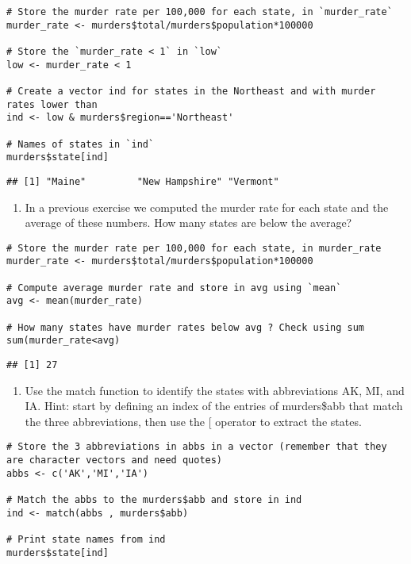 \documentclass[
]{article}
\providecommand{\tightlist}{%
  \setlength{\itemsep}{0pt}\setlength{\parskip}{0pt}}
\begin{document}
\begin{verbatim}
# Store the murder rate per 100,000 for each state, in `murder_rate`
murder_rate <- murders$total/murders$population*100000

# Store the `murder_rate < 1` in `low` 
low <- murder_rate < 1

# Create a vector ind for states in the Northeast and with murder rates lower than
ind <- low & murders$region=='Northeast'

# Names of states in `ind` 
murders$state[ind] 
\end{verbatim}

\begin{verbatim}
## [1] "Maine"         "New Hampshire" "Vermont"
\end{verbatim}

\begin{enumerate}
\def\labelenumi{\arabic{enumi}.}
\setcounter{enumi}{4}
\tightlist
\item
  In a previous exercise we computed the murder rate for each state and
  the average of these numbers. How many states are below the average?
\end{enumerate}

\begin{verbatim}
# Store the murder rate per 100,000 for each state, in murder_rate
murder_rate <- murders$total/murders$population*100000

# Compute average murder rate and store in avg using `mean` 
avg <- mean(murder_rate)

# How many states have murder rates below avg ? Check using sum 
sum(murder_rate<avg)
\end{verbatim}

\begin{verbatim}
## [1] 27
\end{verbatim}

\begin{enumerate}
\def\labelenumi{\arabic{enumi}.}
\setcounter{enumi}{5}
\tightlist
\item
  Use the match function to identify the states with abbreviations AK,
  MI, and IA. Hint: start by defining an index of the entries of
  murders\$abb that match the three abbreviations, then use the {[}
  operator to extract the states.
\end{enumerate}

\begin{verbatim}
# Store the 3 abbreviations in abbs in a vector (remember that they are character vectors and need quotes)
abbs <- c('AK','MI','IA')

# Match the abbs to the murders$abb and store in ind
ind <- match(abbs , murders$abb)

# Print state names from ind
murders$state[ind]
\end{verbatim}
\end{document}
